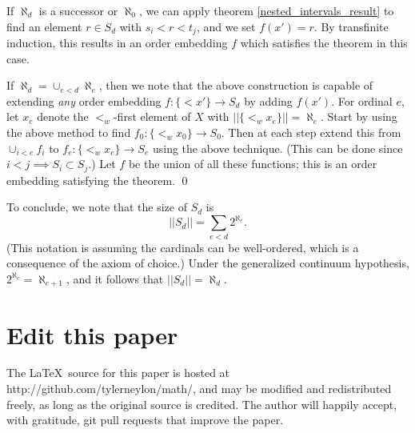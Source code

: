 \documentclass[11pt]{amsart}
\newcommand\epf{\qed\medskip}
\begin{document}
If $\aleph_d$ is a successor or $\aleph_0$, we can apply theorem \ref{nested_intervals_result}
to find an element $r\in S_d$ with $s_i < r < t_j$, and we set $f(x') = r$.
By transfinite induction, this results in an order embedding $f$ which satisfies the theorem in this case.

If $\aleph_d = \cup_{e<d}\aleph_e$, then we note that the above construction is capable of
extending {\em any} order embedding $f:\{< x'\}\to S_d$ by adding $f(x')$.
For ordinal $e$, let $x_e$ denote the $<_w$-first element of $X$ with
$||\{<_w x_e\}|| = \aleph_e$.  Start by using the above method to find
$f_0:\{<_w x_0\}\to S_0$.
Then at each step extend this from $\cup_{i<e}f_i$ to
$f_e:\{<_w x_e\}\to S_e$ using
the above technique.
(This can be done since $i<j \implies S_i \subset S_j$.)
Let $f$ be the union of all these functions; this is an order
embedding satisfying the theorem.
\epf

To conclude, we note that the size of $S_d$ is
$$ ||S_d|| = \sum_{e<d} 2^{\aleph_e}.$$
(This notation is assuming the cardinals can be well-ordered,
which is a consequence of the axiom of choice.)
Under the generalized continuum hypothesis,
$2^{\aleph_e} = \aleph_{e+1}$, and it follows that
$||S_d|| = \aleph_d$.

\section{Edit this paper}

The \LaTeX\ source for this paper is hosted at
{\sf http://github.com/tylerneylon/math/},
and may be modified and redistributed freely,
as long as the original source is credited.
The author will happily accept, with gratitude,
git pull requests that improve the paper.
\end{document}
